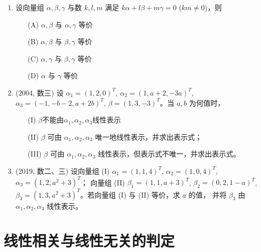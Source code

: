 \documentclass[12pt, a4paper, oneside, UTF8]{ctexbook}
\begin{document}
\begin{enumerate}[label=\arabic*.]
    \item 设向量组 $\alpha, \beta, \gamma$ 与数 $k, l, m$ 满足 $k\alpha + l\beta + m\gamma = 0$ ($km \neq 0$)，则
    \begin{enumerate}
        \item [(A)] $\alpha, \beta$ 与 $\alpha, \gamma$ 等价
        \item [(B)] $\alpha, \beta$ 与 $\beta, \gamma$ 等价
        \item [(C)] $\alpha, \gamma$ 与 $\beta, \gamma$ 等价
        \item [(D)] $\alpha$ 与 $\gamma$ 等价
    \end{enumerate}
    
    \begin{solution}
    \newpage
    \end{solution}
    
    \item (2004, 数三) 设 $\alpha_1 = (1,2,0)^T$, $\alpha_2 = (1, a+2, -3a)^T$, $\alpha_3 = (-1, -b-2, a+2b)^T$,
    $\beta = (1,3,-3)^T$。当 $a, b$ 为何值时，
    \begin{enumerate}
        \item [(I)] $\beta$不能由$\alpha_1, \alpha_2, \alpha_3$线性表示
        \item [(II)] $\beta$ 可由 $\alpha_1, \alpha_2, \alpha_3$ 唯一地线性表示，并求出表示式；
        \item [(III)] $\beta$ 可由 $\alpha_1, \alpha_2, \alpha_3$ 线性表示，但表示式不唯一，并求出表示式。
    \end{enumerate}
    
    \begin{solution}
    \newpage
    \end{solution}
    
    \item (2019, 数二、三) 设向量组 (I) $\alpha_1 = (1,1,4)^T$, $\alpha_2 = (1,0,4)^T$, $\alpha_3 = (1,2, a^2+3)^T$；
    向量组 (II) $\beta_1 = (1,1, a+3)^T$, $\beta_2 = (0,2,1-a)^T$, $\beta_3 = (1,3, a^2+3)^T$。若向量组 (I) 与 (II) 等价，求 $a$ 的值，
    并将 $\beta_3$ 由 $\alpha_1, \alpha_2, \alpha_3$ 线性表示。
    
    \begin{solution}
    \newpage
    \end{solution}
\end{enumerate}

\section{线性相关与线性无关的判定}
\end{document}
